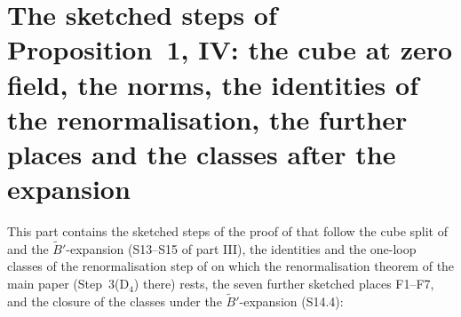
\section{The sketched steps of Proposition~1, IV: the cube at zero field, the norms, the identities of the renormalisation, the further places and the classes after the expansion}\label{sup4:sec}

This part contains the sketched steps of the proof of \cite[Prop.~1, (1.33)]{Ba3} that follow the cube split of \cite[p.~433]{Ba3} and the $\tilde B'$-expansion (S13--S15 of part III), the identities and the one-loop classes of the renormalisation step of \cite[pp.~434--445]{Ba3} on which the renormalisation theorem of the main paper (Step~3(D$_4$) there) rests, the seven further sketched places F1--F7, and the closure of the classes under the $\tilde B'$-expansion (S14.4):

